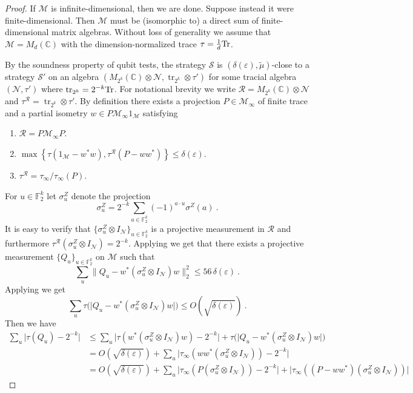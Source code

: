 \documentclass[11pt]{article}
\theoremstyle{definition}
\newcommand{\strategy}{\mathscr{S}}
\newcommand{\Tr}{\mbox{\rm Tr}}
\newcommand{\C}{\ensuremath{\mathbb{C}}}
\newcommand{\F}{\ensuremath{\mathbb{F}}}
\newcommand{\mM}{\ensuremath{\mathcal{M}}}
\newcommand{\mR}{\ensuremath{\mathcal{R}}}
\newcommand{\eps}{\varepsilon}
\newcommand{\mN}{\mathcal{N}}
\DeclareMathOperator{\tr}{tr}
\begin{document}
\begin{proof}
If $\mM$ is infinite-dimensional, then we are done. Suppose instead it were finite-dimensional. Then $\mM$ must be (isomorphic to) a direct sum of finite-dimensional matrix algebras. Without loss of generality we assume that $\mM = M_{d}(\C)$ with the dimension-normalized trace $\tau = \frac{1}{d} \Tr$. 

By the soundness property of qubit tests, the strategy $\strategy$ is $(\delta(\eps),\tilde{\mu})$-close to a strategy $\strategy'$ on an algebra $(M_{2^k}(\C) \otimes \mN,\tr_{2^k} \otimes \tau')$ for some tracial algebra $(\mN,\tau')$ where $\tr_{2^k} = 2^{-k} \Tr$. For notational brevity we write $\mR = M_{2^k}(\C) \otimes \mN$ and $\tau^{\mR} = \tr_{2^k} \otimes \tau'$. By definition there exists a projection $P \in \mM_\infty$ of finite trace and a partial isometry $w \in P \mM_\infty 1_\mM$ satisfying
\begin{enumerate}
	\item $\mR = P \mM_\infty P$. 
	\item $\max \left \{ \tau(1_\mM - w^* w), \tau^{\mR} (P - w w^*) \right \} \leq \delta(\eps)$.
	\item $\tau^{\mR} = \tau_\infty/\tau_\infty(P)$.
\end{enumerate}
For $u \in \F_2^k$ let $\sigma^Z_u$ denote the projection
\[
	\sigma^Z_u = 2^{-k} \sum_{a \in \F_2^k} (-1)^{a \cdot u} \sigma^Z(a)~.
\]
It is easy to verify that $\{\sigma^Z_u \otimes I_\mN \}_{u \in \F_2^k}$ is a projective measurement in $\mR$ and furthermore $\tau^{\mR}(\sigma^Z_u \otimes I_\mN) = 2^{-k}$. Applying  we get that there exists a projective measurement $\{Q_u\}_{u \in \F_2^k}$ on $\mM$ such that
\[
	\sum_u \| Q_u - w^* (\sigma^Z_u \otimes I_\mN) w \|_2^2 \leq 56\, \delta(\eps)~.
\]
Applying  we get
\[
	\sum_u \tau \Big ( \Big| Q_u - w^* (\sigma^Z_u \otimes I_\mN) w\Big| \Big) \leq O(\sqrt{\delta(\eps)})~.
\]
Then we have
\begin{align*}
	\sum_u \Big| \tau(Q_u) - 2^{-k} \Big| &\leq \sum_u \Big | \tau(w^* (\sigma^Z_u \otimes I_\mN) w) - 2^{-k} \Big| + \tau \Big ( \Big| Q_u - w^* (\sigma^Z_u \otimes I_\mN) w\Big| \Big) \\
	&= O(\sqrt{\delta(\eps)}) + \sum_u \Big | \tau_\infty (w w^* (\sigma^Z_u \otimes I_\mN)) - 2^{-k} \Big| \\
	&= O(\sqrt{\delta(\eps)}) + \sum_u \Big | \tau_\infty (P (\sigma^Z_u \otimes I_\mN)) - 2^{-k} \Big| + \Big | \tau_\infty((P - ww^*)(\sigma^Z_u \otimes I_\mN)) \Big|

\end{align*}
\end{proof}
\end{document}
